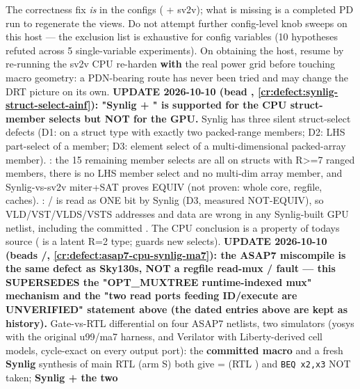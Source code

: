 \begin{record}
The correctness fix \emph{is} in the configs ( +
sv2v); what is missing is a completed PD run to regenerate the views. Do
not attempt further config-level knob sweeps on this host --- the
exclusion list is exhaustive for config variables (10 hypotheses refuted
across 5 single-variable experiments). On obtaining the host, resume by
re-running the sv2v CPU re-harden \textbf{with} the real power grid
before touching macro geometry: a PDN-bearing route has never been tried
and may change the DRT picture on its own. \bad{} \textbf{UPDATE
2026-10-10 (bead , \cref{cr:defect:synlig-struct-select-ainf}):
"Synlig + " is supported for the CPU struct-member selects but
NOT for the GPU.} Synlig has three silent struct-select defects (D1:
 on a struct type with exactly two packed-range members;
D2: LHS part-select of a member; D3: element select of a
multi-dimensional packed-array member). : the 15 remaining
member selects are all on structs with R\textgreater=7 ranged members,
there is no LHS member select and no multi-dim array member, and
Synlig-vs-sv2v miter+SAT proves 
EQUIV (not proven: whole core, regfile, caches). :
 / is
read as ONE bit by Synlig (D3, measured NOT-EQUIV), so
VLD/\allowbreak{}VST/\allowbreak{}VLDS/\allowbreak{}VSTS addresses and
data are wrong in any Synlig-built GPU netlist, including the committed
. The CPU conclusion is a property
of today\textquotesingle s source ( is a latent R=2
type;  guards new selects). \ok{}
\textbf{UPDATE 2026-10-10 (beads /,
\cref{cr:defect:asap7-cpu-synlig-ma7}): the ASAP7 miscompile is the same
defect as Sky130\textquotesingle s, NOT a regfile read-mux /
 fault --- this SUPERSEDES the
"OPT\_\allowbreak{}MUXTREE runtime-indexed mux" mechanism and the "two
read ports feeding ID/\allowbreak{}execute are UNVERIFIED" statement
above (the dated entries above are kept as history).} Gate-vs-RTL
differential on four ASAP7  netlists, two simulators
(yosys  with the original u99/ma7 harness, and Verilator with
Liberty-derived cell models, cycle-exact on every output port): the
\textbf{committed macro} and a fresh \textbf{Synlig} synthesis of main
RTL (arm S) both give = (RTL )
and \texttt{BEQ\ x2,\allowbreak{}x3} NOT taken; \textbf{Synlig + the two
}
\end{record}
